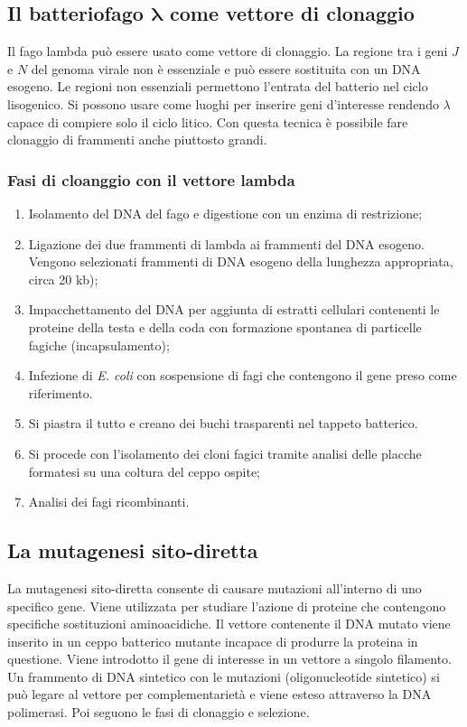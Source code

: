 	\subsection{Il batteriofago $\mathbf{\lambda}$ come vettore di clonaggio}
	Il fago lambda può essere usato come vettore di clonaggio. 
	La regione tra i geni $J$ e $N$ del genoma virale non è essenziale e può essere sostituita con un DNA esogeno. 
	Le regioni non essenziali permettono l'entrata del batterio nel ciclo lisogenico.
	Si possono usare come luoghi per inserire geni d'interesse rendendo $\lambda$ capace di compiere solo il ciclo litico.
	Con questa tecnica è possibile fare clonaggio di frammenti anche piuttosto grandi.

	
		\subsubsection{Fasi di cloanggio con il vettore lambda}
		\begin{multicols}{2}
			\begin{enumerate}
    				\item Isolamento del DNA del fago e digestione con un enzima di restrizione; 
    				\item Ligazione dei due frammenti di lambda ai frammenti del DNA esogeno. 
					Vengono selezionati  frammenti di DNA esogeno della lunghezza appropriata, circa 20 kb); 
    				\item Impacchettamento del DNA per aggiunta di estratti cellulari contenenti le proteine della testa e della coda con formazione spontanea di particelle fagiche (incapsulamento); 
    				\item Infezione di \textit{E. coli} con sospensione di fagi che contengono il gene preso come riferimento. 
				\item Si piastra il tutto e creano dei buchi trasparenti nel tappeto batterico. 
				\item Si procede con l'isolamento dei cloni fagici tramite analisi delle placche formatesi su una coltura del ceppo ospite; 
    				\item Analisi dei fagi ricombinanti. 

			\end{enumerate}
		\end{multicols}

	\subsection{La mutagenesi sito-diretta}
	La mutagenesi sito-diretta consente di causare mutazioni all'interno di uno specifico gene.
	Viene utilizzata per studiare l'azione di proteine che contengono specifiche sostituzioni aminoacidiche. 
	Il vettore contenente il DNA mutato viene inserito in un ceppo batterico mutante incapace di produrre la proteina in questione. 
	Viene introdotto il gene di interesse in un vettore a singolo filamento.
	Un frammento di DNA sintetico con le mutazioni (oligonucleotide sintetico) si può legare al vettore per complementarietà e viene esteso attraverso la DNA polimerasi. 
	Poi seguono le fasi di clonaggio e selezione. 
	
